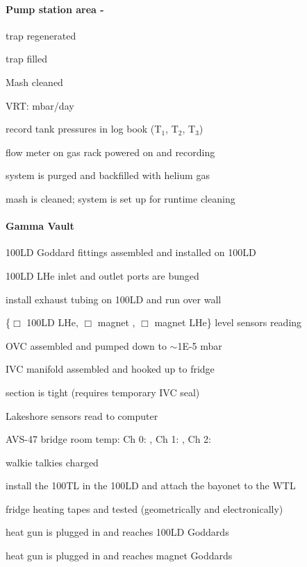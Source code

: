 \begin{appendices}
\begin{minipage}{\textwidth}
\paragraph{Pump station area - \het}
\begin{checklist}
 \item \lnn{} trap regenerated
 \item \lnn{} trap filled
 \item Mash cleaned
 \item \het{} VRT: \makebox[1cm]{\hrulefill} mbar/day
 \item record \het{} tank pressures in log book (T$_1$, T$_2$, T$_3$)
 \item flow meter on \het{} gas rack powered on and recording
 \item system is purged and backfilled with helium gas 
 \item mash is cleaned; system is set up for runtime cleaning
\end{checklist}
\end{minipage}

\begin{minipage}{\textwidth}
\paragraph{Gamma Vault}
\begin{checklist}
 \item 100LD Goddard fittings assembled and installed on 100LD
 \item 100LD LHe inlet and outlet ports are bunged
 \item install exhaust tubing on 100LD and run over wall
 \item \{$\Box$ 100LD LHe, $\Box$ magnet \lnn, $\Box$ magnet LHe\} level sensors reading
 \item OVC assembled and pumped down to $\sim$1E-5 mbar %
 \item IVC manifold assembled and hooked up to fridge
 \item \het{} section is tight (requires temporary IVC seal)
 \item Lakeshore sensors read to computer
 \item AVS-47 bridge room temp: Ch 0: \makebox[1cm]{\hrulefill}, Ch 1: \makebox[1cm]{\hrulefill} , Ch 2: \makebox[1cm]{\hrulefill}  
 \item walkie talkies charged
 \item install the 100TL in the 100LD and attach the bayonet to the WTL
 \item fridge heating tapes and tested (geometrically and electronically)
 \item heat gun is plugged in and reaches 100LD Goddards 
 \item heat gun is plugged in and reaches magnet Goddards
\end{checklist}
\end{minipage}


\end{appendices}
